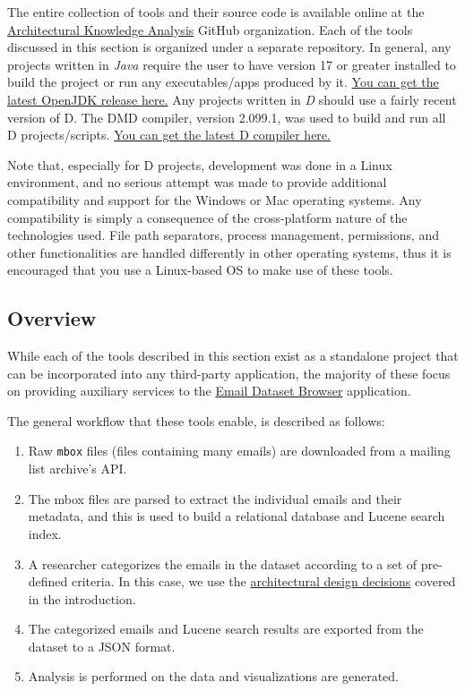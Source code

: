 \documentclass[a4paper, 12pt]{article}
\begin{document}
	The entire collection of tools and their source code is available online at the \href{https://github.com/ArchitecturalKnowledgeAnalysis}{Architectural Knowledge Analysis} GitHub organization. Each of the tools discussed in this section is organized under a separate repository. In general, any projects written in \textit{Java} require the user to have version 17 or greater installed to build the project or run any executables/apps produced by it. \href{https://adoptium.net/temurin/releases}{You can get the latest OpenJDK release here.} Any projects written in \textit{D} should use a fairly recent version of D. The DMD compiler, version 2.099.1, was used to build and run all D projects/scripts. \href{https://dlang.org/download.html}{You can get the latest D compiler here.}
	
	Note that, especially for D projects, development was done in a Linux environment, and no serious attempt was made to provide additional compatibility and support for the Windows or Mac operating systems. Any compatibility is simply a consequence of the cross-platform nature of the technologies used. File path separators, process management, permissions, and other functionalities are handled differently in other operating systems, thus it is encouraged that you use a Linux-based OS to make use of these tools.
	
	\subsection{Overview}
		While each of the tools described in this section exist as a standalone project that can be incorporated into any third-party application, the majority of these focus on providing auxiliary services to the \hyperref[sec:email-dataset-browser]{Email Dataset Browser} application.
		
		The general workflow that these tools enable, is described as follows:
		
		\begin{enumerate}
			\item Raw \texttt{mbox} files (files containing many emails) are downloaded from a mailing list archive's API.
			\item The mbox files are parsed to extract the individual emails and their metadata, and this is used to build a relational database and Lucene search index.
			\item A researcher categorizes the emails in the dataset according to a set of pre-defined criteria. In this case, we use the \hyperref[sec:design-decisions]{architectural design decisions} covered in the introduction.
			\item The categorized emails and Lucene search results are exported from the dataset to a JSON format.
			\item Analysis is performed on the data and visualizations are generated.
		\end{enumerate}
	
\end{document}
